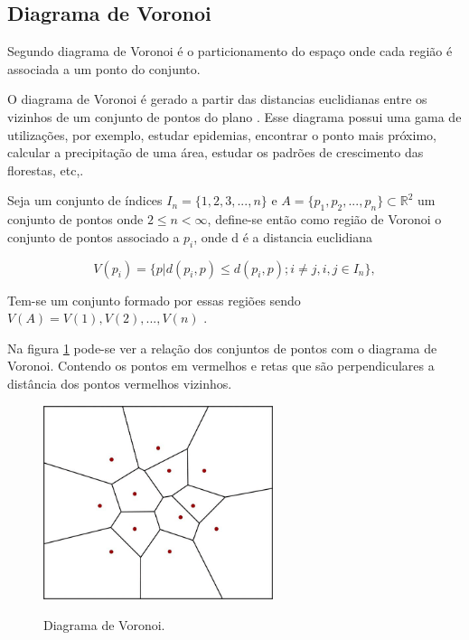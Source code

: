 \subsection{Diagrama de Voronoi}

Segundo  diagrama de Voronoi é o particionamento do espaço onde cada região é associada a um ponto do conjunto.

O diagrama de Voronoi é gerado a partir das distancias euclidianas entre os vizinhos de um conjunto de pontos do plano\space
\cite{diagrama_de_voronoi:_uma_exploracao_nas_distancias_euclidiana_e_do_taxi}. Esse diagrama possui uma gama de utilizações, por exemplo, estudar epidemias, encontrar o
ponto mais próximo, calcular a precipitação de uma área, estudar os padrões de crescimento das florestas, etc,\space\cite{poligonos_de_thiessen_ou_voronoi}.

Seja um conjunto de índices $I_n = \{1, 2, 3, ..., n\}$ e $A = \{p_1, p_2, ..., p_n\} \subset \mathbb{R}^2$ um conjunto de pontos onde $2 \leq n < \infty$, define-se então como região de Voronoi o conjunto de pontos associado a $p_i$, onde d é a distancia euclidiana

\begin{equation}
	V(p_i) = \{p|d(p_i,p) \leq d(p_i,p);i \neq j, i, j \in I_n\},
\end{equation}

Tem-se um conjunto formado por essas regiões sendo $V(A) = {V(1), V(2), ..., V(n)}$ \space\cite{rodrigues_diagrama_2019}.

Na figura \cref{fig:diagrama_voronoi} pode-se ver a relação dos conjuntos de pontos com o diagrama de Voronoi. Contendo os pontos em vermelhos e retas que são perpendiculares a distância dos pontos vermelhos vizinhos.

\begin{figure}[ht]
	\centering
	\caption{Diagrama de Voronoi.}
	\includegraphics[width=0.6\textwidth]{figures/diagrama_voronoi.png}
	\label{fig:diagrama_voronoi}
\end{figure}
